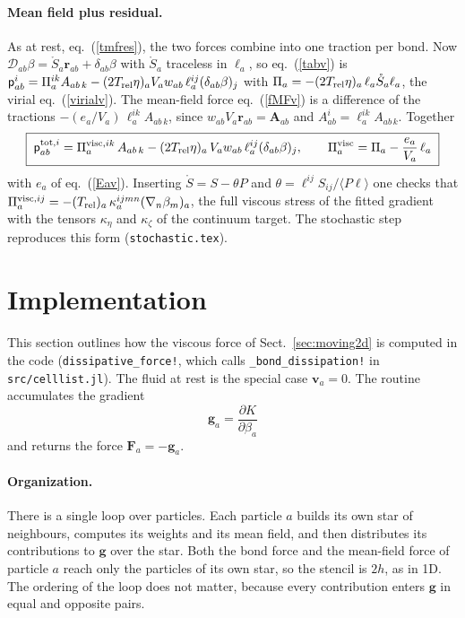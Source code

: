 \documentclass[11pt,aps,preprint,nofootinbib,superscriptaddress,tightenlines]{revtex4-2}
\def\st{\begin{equation}}
\def\stp{\end{equation}}
\def\Eq#1{eq.~(\ref{#1})}
\def\Sect#1{Sect.~\ref{#1}}
\newcommand{\avg}[1]{\langle #1\rangle}
\let\oldparagraph\paragraph
\renewcommand{\paragraph}{\par\bigskip\oldparagraph}
\begin{document}
\paragraph{Mean field plus residual.}  As at rest, \Eq{tmfres}, the two forces
combine into one traction per bond.  Now
$\mathcal D_{ab}\beta=\mathring S_a\bm r_{ab}+\delta_{ab}\beta$ with $\mathring S_a$
traceless in $\ell_a$, so \Eq{tabv} is
$\mathsf p^i_{ab}=\Pi_a^{ik}A_{ab\,k}-(2T_{\rm rel}\eta)_aV_aw_{ab}\,\ell_a^{ij}(\delta_{ab}\beta)_j$
with $\Pi_a=-(2T_{\rm rel}\eta)_a\,\ell_a\mathring S_a\ell_a$, the virial
\Eq{virialv}.  The mean-field force \Eq{fMFv} is a difference of the tractions
$-(e_a/V_a)\,\ell_a^{ik}A_{ab\,k}$, since $w_{ab}V_a\bm r_{ab}=\bm A_{ab}$ and
$A^i_{ab}=\ell_a^{ik}A_{ab\,k}$.  Together
\st
\boxed{\;\mathsf p^{{\rm tot},i}_{ab}=\Pi^{{\rm visc},ik}_a\,A_{ab\,k}
-(2T_{\rm rel}\eta)_a\,V_aw_{ab}\,\ell_a^{ij}(\delta_{ab}\beta)_j ,\qquad
\Pi^{\rm visc}_a=\Pi_a-\frac{e_a}{V_a}\,\ell_a\;}
\label{tmfresv}
\stp
with $e_a$ of \Eq{Eav}.  Inserting $\mathring S=S-\theta P$ and
$\theta=\ell^{ij}S_{ij}/\avg{P\ell}$ one checks that
$\Pi^{{\rm visc},ij}_a=-(T_{\rm rel})_a\,\kappa_a^{ijmn}(\nabla_n\beta_m)_a$, the full
viscous stress of the fitted gradient with the tensors $\kappa_\eta$ and $\kappa_\zeta$
of the continuum target.  The stochastic step reproduces this form
(\texttt{stochastic.tex}).

\section{Implementation}
\label{sec:impl}

This section outlines how the viscous force of \Sect{sec:moving2d} is computed
in the code (\texttt{dissipative\_force!}, which calls
\texttt{\_bond\_dissipation!} in \texttt{src/celllist.jl}).  The fluid at rest is
the special case $\bm v_a=0$.  The routine accumulates the gradient
\st
\bm g_a=\frac{\partial K}{\partial\beta_a}
\stp
and returns the force $\bm F_a=-\bm g_a$.

\paragraph{Organization.}  There is a single loop over particles.  Each particle
$a$ builds its own star of neighbours, computes its weights and its mean
field, and then distributes its contributions to $\bm g$ over the star.  Both
the bond force and the mean-field force of particle $a$ reach only the
particles of its own star, so the stencil is $2h$, as in 1D.  The ordering of
the loop does not matter, because every contribution enters $\bm g$ in
equal and opposite pairs.
\end{document}
